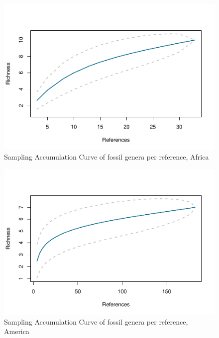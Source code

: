 \documentclass[]{article}
\begin{document}
\begin{figure}[htbp]
\centering
\includegraphics{MA_JJ_files/figure-latex/SACGAfrica-1.pdf}
\caption{Sampling Accumulation Curve of fossil genera per reference,
Africa}
\end{figure}

\begin{figure}[htbp]
\centering
\includegraphics{MA_JJ_files/figure-latex/SACGAmerica-1.pdf}
\caption{Sampling Accumulation Curve of fossil genera per reference,
America}
\end{figure}
\end{document}

